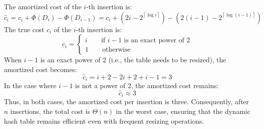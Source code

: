 The amortized cost of the $i$-th insertion is:
\[\hat{c}_i=c_i+\Phi(D_i)-\Phi(D_{i-1})=c_i+(2i - 2^{\left\lceil \log i\right\rceil })-(2(i-1) - 2^{\left\lceil \log (i-1)\right\rceil })\]
The true cost $c_i$ of the $i$-th insertion is:
\[c_i=\begin{cases}
    i \qquad \text{if }i-1\text{ is an exact power of }2 \\
    1 \qquad \text{otherwise}
\end{cases}\]
When $i - 1$ is an exact power of 2 (i.e., the table needs to be resized), the amortized cost becomes:
\[\hat{c}_i=i + 2 - 2i + 2 + i - 1=3\]
In the case where $i - 1$ is not a power of 2, the amortized cost remains:
\[\hat{c}_i\approx 3\]
Thus, in both cases, the amortized cost per insertion is three. 
Consequently, after $n$ insertions, the total cost is $\Theta(n)$ in the worst case, ensuring that the dynamic hash table remains efficient even with frequent resizing operations.